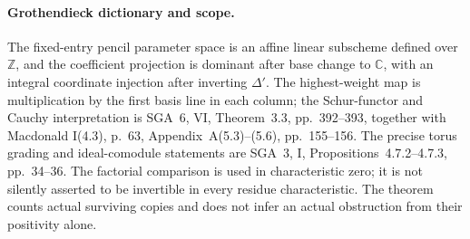 \paragraph{Grothendieck dictionary and scope.}
The fixed-entry pencil parameter space is an affine linear
subscheme defined over \(\mathbb Z\), and the coefficient
projection is dominant after base change to \(\mathbb C\),
with an integral coordinate injection after inverting
\(\Delta'\). The highest-weight map is multiplication
by the first basis line in each column; the Schur-functor
and Cauchy interpretation is SGA~6, VI, Theorem~3.3,
pp.~392--393, together with Macdonald I(4.3), p.~63,
Appendix~A(5.3)--(5.6), pp.~155--156.
The precise torus grading and ideal-comodule statements
are SGA~3, I, Propositions~4.7.2--4.7.3, pp.~34--36.
The factorial comparison is used in characteristic zero;
it is not silently asserted to be invertible in every
residue characteristic. The theorem counts actual surviving
copies and does not infer an actual obstruction from their
positivity alone.
